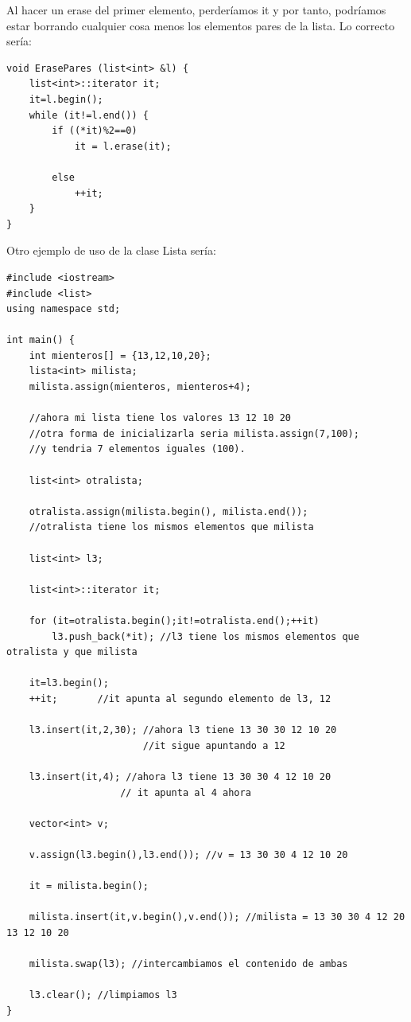 \documentclass[10pt,a4paper,spanish]{report}
\begin{document}
\noindent
Al hacer un erase del primer elemento, perderíamos it y por tanto, podríamos estar borrando cualquier cosa menos los elementos pares de la lista. Lo correcto sería:

\begin{verbatim}
void ErasePares (list<int> &l) {
    list<int>::iterator it;
    it=l.begin();
    while (it!=l.end()) {
        if ((*it)%2==0)
            it = l.erase(it);

        else
            ++it;
    }
}
\end{verbatim}

\noindent
Otro ejemplo de uso de la clase Lista sería:

\begin{verbatim}
#include <iostream>
#include <list>
using namespace std;

int main() {
    int mienteros[] = {13,12,10,20};
    lista<int> milista;
    milista.assign(mienteros, mienteros+4); 

    //ahora mi lista tiene los valores 13 12 10 20
    //otra forma de inicializarla seria milista.assign(7,100);
    //y tendria 7 elementos iguales (100).

    list<int> otralista;

    otralista.assign(milista.begin(), milista.end());
    //otralista tiene los mismos elementos que milista

    list<int> l3;

    list<int>::iterator it;

    for (it=otralista.begin();it!=otralista.end();++it)
        l3.push_back(*it); //l3 tiene los mismos elementos que otralista y que milista

    it=l3.begin();
    ++it;       //it apunta al segundo elemento de l3, 12

    l3.insert(it,2,30); //ahora l3 tiene 13 30 30 12 10 20
                        //it sigue apuntando a 12

    l3.insert(it,4); //ahora l3 tiene 13 30 30 4 12 10 20
                    // it apunta al 4 ahora

    vector<int> v;

    v.assign(l3.begin(),l3.end()); //v = 13 30 30 4 12 10 20

    it = milista.begin();

    milista.insert(it,v.begin(),v.end()); //milista = 13 30 30 4 12 20 13 12 10 20

    milista.swap(l3); //intercambiamos el contenido de ambas

    l3.clear(); //limpiamos l3
}
\end{verbatim}
\end{document}
